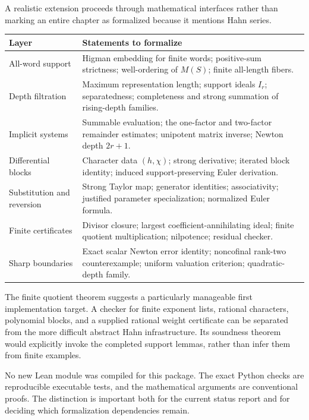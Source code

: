 \documentclass[11pt,a4paper]{article}
\theoremstyle{definition}
\theoremstyle{remark}
\begin{document}
A realistic extension proceeds through mathematical interfaces rather than
marking an entire chapter as formalized because it mentions Hahn series.
\begin{center}
\begin{tabular}{@{}p{}p{}@{}}
\toprule
Layer & Statements to formalize\\
\midrule
All-word support & Higman embedding for finite words; positive-sum
strictness; well-ordering of $M(S)$; finite all-length fibers.\\[0.4em]
Depth filtration & Maximum representation length; support ideals $I_r$;
separatedness; completeness and strong summation of rising-depth families.\\[0.4em]
Implicit systems & Summable evaluation; the one-factor and two-factor
remainder estimates; unipotent matrix inverse; Newton depth $2r+1$.\\[0.4em]
Differential blocks & Character data $(h,\chi)$; strong derivative;
iterated block identity; induced support-preserving Euler derivation.\\[0.4em]
Substitution and reversion & Strong Taylor map; generator identities;
associativity; justified parameter specialization; normalized Euler formula.\\[0.4em]
Finite certificates & Divisor closure; largest coefficient-annihilating
ideal; finite quotient multiplication; nilpotence; residual checker.\\[0.4em]
Sharp boundaries & Exact scalar Newton error identity; noncofinal rank-two
counterexample; uniform valuation criterion; quadratic-depth family.\\
\bottomrule
\end{tabular}
\end{center}

The finite quotient theorem suggests a particularly manageable first
implementation target. A checker for finite exponent lists, rational
characters, polynomial blocks, and a supplied rational weight certificate
can be separated from the more difficult abstract Hahn infrastructure.
Its soundness theorem would explicitly invoke the completed support
lemmas, rather than infer them from finite examples.

No new Lean module was compiled for this package. The exact Python checks
are reproducible executable tests, and the mathematical arguments are
conventional proofs. The distinction is important both for the current
status report and for deciding which formalization dependencies remain.
\end{document}
